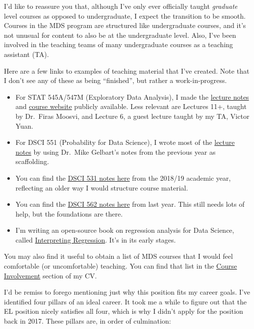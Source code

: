 \documentclass[]{article}
\providecommand{\tightlist}{%
  \setlength{\itemsep}{0pt}\setlength{\parskip}{0pt}}
\begin{document}
I'd like to reassure you that, although I've only ever officially taught \emph{graduate} level courses as opposed to undergraduate, I expect the transition to be smooth. Courses in the MDS program are structured like undergraduate courses, and it's not unusual for content to also be at the undergraduate level. Also, I've been involved in the teaching teams of many undergraduate courses as a teaching assistant (TA).

Here are a few links to examples of teaching material that I've created. Note that I don't see any of these as being ``finished'', but rather a work-in-progress.

\begin{itemize}
\tightlist
\item
  For STAT 545A/547M (Exploratory Data Analysis), I made the \href{https://stat545guidebook.netlify.com/}{lecture notes} and \href{https://stat545.stat.ubc.ca/}{course website} publicly available. Less relevant are Lectures 11+, taught by Dr.~Firas Moosvi, and Lecture 6, a guest lecture taught by my TA, Victor Yuan.
\item
  For DSCI 551 (Probability for Data Science), I wrote most of the \href{https://ubc-mds.github.io/DSCI_551_stat-prob-dsci/lectures/}{lecture notes} by using Dr.~Mike Gelbart's notes from the previous year as scaffolding.
\item
  You can find the \href{https://ubc-mds.github.io/DSCI_531_viz-1/}{DSCI 531 notes here} from the 2018/19 academic year, reflecting an older way I would structure course material.
\item
  You can find the \href{https://ubc-mds.github.io/DSCI_562_regr-2/}{DSCI 562 notes here} from last year. This still needs lots of help, but the foundations are there.
\item
  I'm writing an open-source book on regression analysis for Data Science, called \href{https://interpreting-regression.netlify.com/}{Interpreting Regression}. It's in its early stages.
\end{itemize}

You may also find it useful to obtain a list of MDS courses that I would feel comfortable (or uncomfortable) teaching. You can find that list in the \protect\hyperlink{course-involvement}{Course Involvement} section of my CV.

I'd be remiss to forego mentioning just why this position fits my career goals. I've identified four pillars of an ideal career. It took me a while to figure out that the EL position nicely satisfies all four, which is why I didn't apply for the position back in 2017. These pillars are, in order of culmination:
\end{document}
